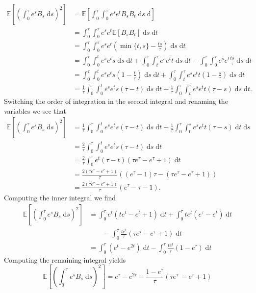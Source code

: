 \documentclass[reqno,12pt]{amsart}
\theoremstyle{plain}%
\theoremstyle{definition}
\begin{document}
\begin{align*}
    \mathbb{E}\left[\left(\int_0^{\tau} e^s B_s\;\mathrm{d}s\right)^2\right] & = \mathbb{E}\left[\int_0^{\tau} \int_0^\tau e^s e^t B_sB_t\;\mathrm{d}s\;\mathrm{d}\right] \\
    & = \int_0^\tau \int_0^\tau e^s e^t \mathbb{E}[B_sB_t] \;\mathrm{d}s\;\mathrm{d}t \\
    & = \int_0^\tau \int_0^\tau e^s e^t\left(\min\{t, s\} - \frac{ts}{\tau}\right) \;\mathrm{d}s\;\mathrm{d}t \\
    & = \int_0^\tau \int_0^t e^s e^t s\;\mathrm{d}s\;\mathrm{d}t + \int_0^\tau \int_t^\tau e^s e^t t\;\mathrm{d}s\;\mathrm{d}t - \int_0^\tau \int_0^\tau e^s e^t \frac{ts}{\tau} \;\mathrm{d}s\;\mathrm{d}t \\
    & = \int_0^\tau \int_0^t e^s e^t s\left(1 - \frac{t}{\tau}\right)\;\mathrm{d}s\;\mathrm{d}t + \int_0^\tau \int_t^\tau e^s e^t t\left(1 - \frac{s}{\tau}\right)\;\mathrm{d}s\;\mathrm{d}t \\
    & = \frac{1}{\tau}\int_0^\tau \int_0^t e^s e^t s\left(\tau - t\right)\;\mathrm{d}s\;\mathrm{d}t + \frac{1}{\tau}\int_0^\tau \int_t^\tau e^s e^t t\left(\tau -s\right)\;\mathrm{d}s\;\mathrm{d}t.
\end{align*}
Switching the order of integration in the second integral and renaming the variables we see that
\begin{align*}
    \mathbb{E}\left[\left(\int_0^{\tau} e^s B_s\;\mathrm{d}s\right)^2\right] & = \frac{1}{\tau}\int_0^\tau \int_0^t e^s e^t s\left(\tau - t\right)\;\mathrm{d}s\;\mathrm{d}t + \frac{1}{\tau}\int_0^\tau \int_0^s e^s e^t t\left(\tau -s\right)\;\mathrm{d}t\;\mathrm{d}s \\
    & = \frac{2}{\tau}\int_0^\tau \int_0^t e^s e^t s\left(\tau - t\right)\;\mathrm{d}s\;\mathrm{d}t \\
    & = \frac{2}{\tau}\int_0^\tau e^t(\tau - t)(\tau e^\tau - e^\tau + 1)\;\mathrm{d}t \\
    & = \frac{2(\tau e^\tau - e^\tau + 1)}{\tau}((e^\tau - 1)\tau - (\tau e^\tau - e^\tau + 1)) \\
    & = \frac{2(\tau e^\tau - e^\tau + 1)}{\tau}(e^\tau - \tau - 1).
\end{align*}
Computing the inner integral we find
\begin{align*}
    \mathbb{E}\left[\left(\int_0^{\tau} e^s B_s\;\mathrm{d}s\right)^2\right] & = \int_0^\tau e^t(te^t-e^t+1)\;\mathrm{d}t + \int_0^\tau te^t(e^\tau - e^t)\;\mathrm{d}t \\
    & \qquad - \int_0^\tau \frac{te^t}{\tau}\left(\tau e^\tau - e^\tau + 1\right)\;\mathrm{d}t \\
    & = \int_0^\tau (e^t-e^{2t})\;\mathrm{d}t - \int_0^\tau \frac{te^t}{\tau}\left(1 - e^\tau\right)\;\mathrm{d}t
\end{align*}
Computing the remaining integral yields
\[
    \mathbb{E}\left[\left(\int_0^{\tau} e^s B_s\;\mathrm{d}s\right)^2\right] = e^{\tau} - e^{2\tau} - \frac{1 - e^\tau}{\tau}\left( \tau e^\tau\ - e^\tau + 1 \right)
\]
\end{document}
